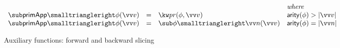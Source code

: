 \begin{figure}[H]
\small
$\begin{array}{lllll}
&&&
\textit{where}
\\
\primAppF{\phi}(\vec{v})
&=&
\exPrimOp{\phi}{\vec{v}}
&
\arity{\phi} \numgt \length{\vec{v}}
\\
\primAppF{\phi}(\vec{v})
&=&
\primFwd{\phi}{\vec{n}}(\vec{v})
&
\arity{\phi} = \length{\vec{n}}
\end{array}$
\caption{Auxiliary functions: forward and backward slicing}
\end{figure}
